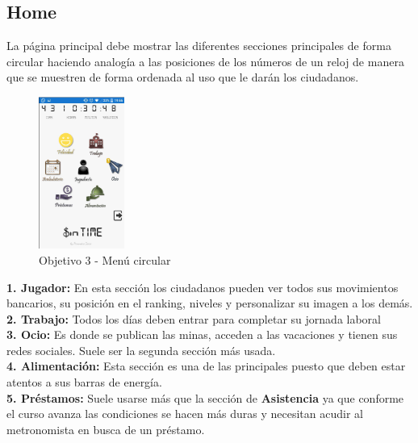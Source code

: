 \newpage

\subsection{Home}

La página principal debe mostrar las diferentes secciones principales de forma circular haciendo analogía a las posiciones de los números de un reloj de manera que se muestren de forma ordenada al uso que le darán los ciudadanos.\\

\begin{figure}
    \centering
    \includegraphics[width=0.25\textwidth]{imagenes/Objetivo4.png}
    \caption{Objetivo 3 - Menú circular}
    \label{objetivoIm3}
\end{figure}
\noindent
\textbf{1. Jugador: } En esta sección los ciudadanos pueden ver todos sus movimientos bancarios, su posición en el ranking, niveles y personalizar su imagen a los demás.\\

\noindent
\textbf{2. Trabajo: } Todos los días deben entrar para completar su jornada laboral\\

\noindent
\textbf{3. Ocio: } Es donde se publican las minas, acceden a las vacaciones y tienen sus redes sociales. Suele ser la segunda sección más usada.\\

\noindent
\textbf{4. Alimentación: } Esta sección es una de las principales puesto que deben estar atentos a sus barras de energía.\\

\noindent
\textbf{5. Préstamos: } Suele usarse más que la sección de \textbf{Asistencia} ya que conforme el curso avanza las condiciones se hacen más duras y necesitan acudir al metronomista en busca de un préstamo.\\

